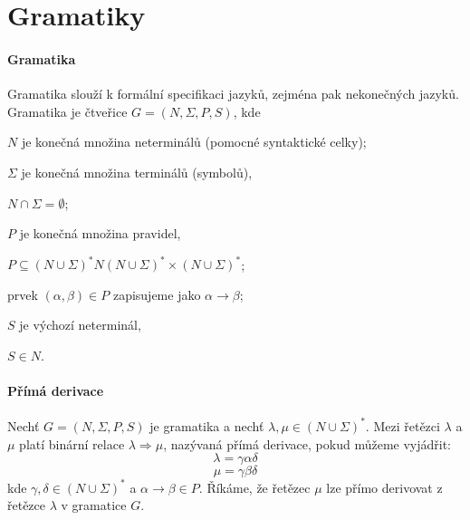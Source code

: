 
\section{Gramatiky}

\paragraph*{Gramatika} Gramatika slouží k formální specifikaci jazyků, zejména pak nekonečných jazyků. Gramatika je čtveřice $G = (N, \Sigma, P, S)$, kde \begin{compactitem}
    \item $N$ je konečná množina neterminálů (pomocné syntaktické celky);
    \item $\Sigma$ je konečná množina terminálů (symbolů), \begin{compactitem}
        \item $N \cap \Sigma = \emptyset$;
    \end{compactitem}
    \item $P$ je konečná množina pravidel, \begin{compactitem}
        \item $P \subseteq (N \cup \Sigma)^* N (N \cup \Sigma)^* \times (N \cup \Sigma)^* $;
        \item prvek $(\alpha, \beta) \in P$ zapisujeme jako $\alpha \rightarrow \beta$;
    \end{compactitem}
    \item $S$ je výchozí neterminál, \begin{compactitem}
        \item $S \in N$.
    \end{compactitem}
\end{compactitem}

\paragraph*{Přímá derivace} Nechť $G = (N, \Sigma, P, S)$ je gramatika a nechť $\lambda, \mu \in (N \cup \Sigma)^*$. Mezi řetězci $\lambda$ a $\mu$ platí binární relace $\lambda \Rightarrow \mu$, nazývaná přímá derivace, pokud můžeme vyjádřit: $$\lambda = \gamma \alpha \delta$$ $$\mu = \gamma \beta \delta$$ kde $\gamma, \delta \in (N \cup \Sigma)^*$ a $\alpha \rightarrow \beta \in P$. Říkáme, že řetězec $\mu$ lze přímo derivovat z řetězce $\lambda$ v gramatice $G$.

